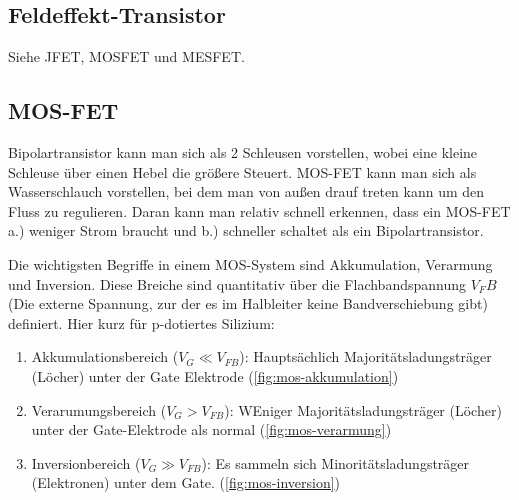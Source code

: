 \subsection{Feldeffekt-Transistor }\label{k6:fet}
Siehe JFET, MOSFET und MESFET.

\subsection{MOS-FET }\label{k6:mosfet}

Bipolartransistor kann man sich als 2 Schleusen vorstellen, wobei eine kleine Schleuse über einen Hebel die größere Steuert. 
MOS-FET kann man sich als Wasserschlauch vorstellen, bei dem man von außen drauf treten kann um den Fluss zu regulieren.
Daran kann man relativ schnell erkennen, dass ein MOS-FET a.) weniger Strom braucht und b.) schneller schaltet als ein Bipolartransistor. 

Die wichtigsten Begriffe in einem MOS-System sind Akkumulation, Verarmung und Inversion.
Diese Breiche sind quantitativ über die Flachbandspannung $V_FB$ (Die externe Spannung, zur der es im Halbleiter keine Bandverschiebung gibt) definiert. 
Hier kurz für p-dotiertes Silizium:
\begin{enumerate}
    \item Akkumulationsbereich ($V_G \ll V_{FB}$): Hauptsächlich Majoritätsladungsträger (Löcher) unter der Gate Elektrode (\autoref{fig:mos-akkumulation})
    \item Verarumungsbereich ($V_G > V_{FB}$): WEniger Majoritätsladungsträger (Löcher) unter der Gate-Elektrode als normal (\autoref{fig:mos-verarmung}) 
    \item Inversionbereich ($V_G \gg V_{FB}$): Es sammeln sich Minoritätsladungsträger (Elektronen) unter dem Gate. (\autoref{fig:mos-inversion}) 
\end{enumerate}


